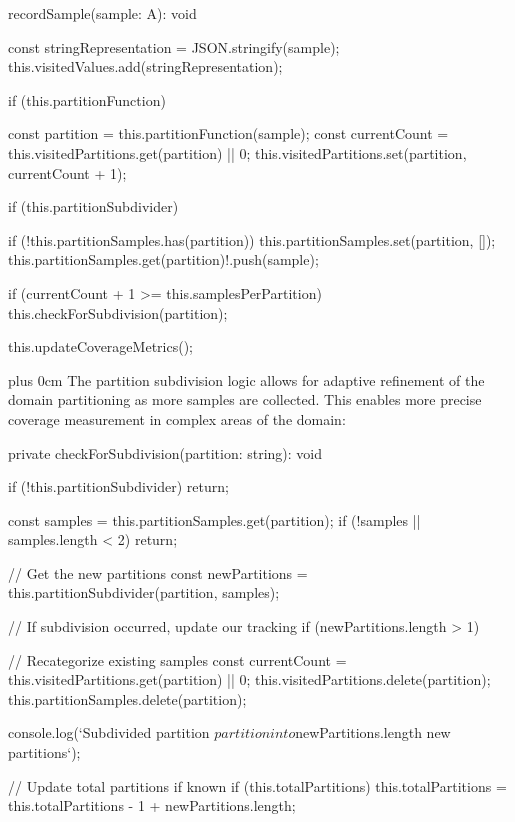 \documentclass[conference]{IEEEtran}
\newcommand{\justifytext}{\leftskip=0pt \rightskip=0pt plus 0cm}
\begin{document}
\begin{wrappedcode}
  recordSample(sample: A): void {
    const stringRepresentation = JSON.stringify(sample);
    this.visitedValues.add(stringRepresentation);
    
    if (this.partitionFunction) {
      const partition = this.partitionFunction(sample);
      const currentCount = this.visitedPartitions.get(partition) || 0;
      this.visitedPartitions.set(partition, currentCount + 1);
      
      if (this.partitionSubdivider) {
        if (!this.partitionSamples.has(partition)) {
          this.partitionSamples.set(partition, []);
        }
        this.partitionSamples.get(partition)!.push(sample);
        
        if (currentCount + 1 >= this.samplesPerPartition) {
          this.checkForSubdivision(partition);
        }
      }
    }
    
    this.updateCoverageMetrics();
  }
\end{wrappedcode}

\justifytext
The partition subdivision logic allows for adaptive refinement of the domain partitioning as more samples are collected. This enables more precise coverage measurement in complex areas of the domain:

\begin{wrappedcode}
  private checkForSubdivision(partition: string): void {
    if (!this.partitionSubdivider) return;
    
    const samples = this.partitionSamples.get(partition);
    if (!samples || samples.length < 2) return;
    
    // Get the new partitions
    const newPartitions = this.partitionSubdivider(partition, samples);
    
    // If subdivision occurred, update our tracking
    if (newPartitions.length > 1) {
      // Recategorize existing samples
      const currentCount = this.visitedPartitions.get(partition) || 0;
      this.visitedPartitions.delete(partition);
      this.partitionSamples.delete(partition);
      
      console.log(`Subdivided partition ${partition} into ${newPartitions.length} new partitions`);
      
      // Update total partitions if known
      if (this.totalPartitions) {
        this.totalPartitions = this.totalPartitions - 1 + newPartitions.length;
      }
    }
  }
\end{wrappedcode}
\end{document}
